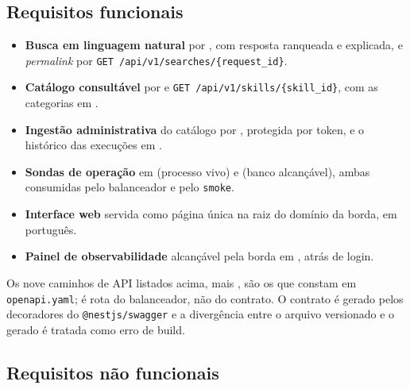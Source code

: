 \documentclass[11pt,a4paper]{article}
\begin{document}
\subsection{Requisitos funcionais}

\begin{itemize}
  \item \textbf{Busca em linguagem natural} por , com resposta
        ranqueada e explicada, e \emph{permalink} por \texttt{GET /api/v1/searches/\{request\_id\}}.
  \item \textbf{Catálogo consultável} por  e
        \texttt{GET /api/v1/skills/\{skill\_id\}}, com as categorias em
        .
  \item \textbf{Ingestão administrativa} do catálogo por ,
        protegida por token, e o histórico das execuções em
        .
  \item \textbf{Sondas de operação} em  (processo vivo) e 
        (banco alcançável), ambas consumidas pelo balanceador e pelo \texttt{smoke}.
  \item \textbf{Interface web} servida como página única na raiz do domínio da borda, em português.
  \item \textbf{Painel de observabilidade} alcançável pela borda em , atrás de
        login.
\end{itemize}

Os nove caminhos de API listados acima, mais , são os que constam em
\texttt{openapi.yaml};  é rota do balanceador, não do contrato. O contrato é
gerado pelos decoradores do \texttt{@nestjs/swagger} e a divergência entre o arquivo versionado e o
gerado é tratada como erro de build.

\subsection{Requisitos não funcionais}
\end{document}
